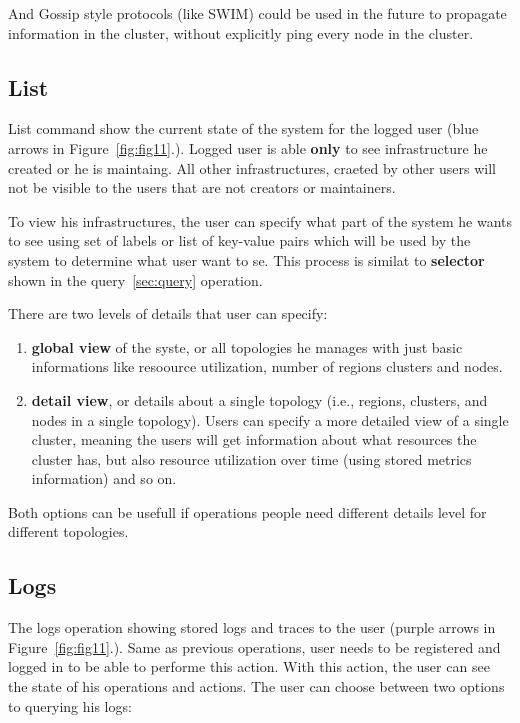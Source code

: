 And Gossip style protocols (like SWIM) could be used in the future to propagate information in the cluster, without explicitly ping every node in the cluster.
%
%
\subsection{List}\label{sec:list}  
List command show the current state of the system for the logged user (blue arrows in Figure~\ref{fig:fig11}.). Logged user is able \textbf{only} to see infrastructure he created or he is maintaing. All other infrastructures, craeted by other users will not be visible to the users that are not creators or maintainers.

To view his infrastructures, the user can specify what part of the system he wants to see using set of labels or list of key-value pairs which will be used by the system to determine what user want to se. This process is similat to \textbf{selector} shown in the query~\ref{sec:query} operation. 

There are two levels of details that user can specify:

\begin{enumerate}[start=1,label={(\bfseries \arabic*)}]
	\item \textbf{global view}  of the syste, or all topologies he manages with just basic informations like resoource utilization, number of regions clusters and nodes.
	\item \textbf{detail view}, or details about a single topology (i.e., regions, clusters, and nodes in a single topology). Users can specify a more detailed view of a single cluster, meaning the users will get information about what resources the cluster has, but also resource utilization over time (using stored metrics information) and so on.
\end{enumerate}

Both options can be usefull if operations people need different details level for different topologies. 
%
%
\subsection{Logs}\label{sec:logs}
% 
The logs operation showing stored logs and traces to the user (purple arrows in Figure~\ref{fig:fig11}.). Same as previous operations, user needs to be registered and logged in to be able to performe this action. With this action, the user can see the state of his operations and actions. The user can choose between two options to querying his logs:

